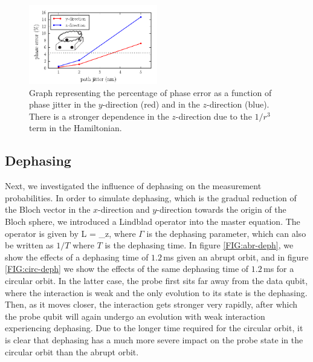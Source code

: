 \begin{figure}[h]
  \centering
    \includegraphics[width=0.5\textwidth]{../Figures/path_jit.pdf}
      \caption{Graph representing the percentage of phase error as a function of phase jitter in the $y$-direction (red) and in the $z$-direction (blue). There is a stronger dependence in the $z$-direction due to the $1/r^3$ term in the Hamiltonian.}
      \label{fig:pathjitter}
\end{figure}







\subsection{Dephasing}
Next, we investigated the influence of dephasing on the measurement probabilities. In order to simulate dephasing, which is the gradual reduction of the Bloch vector in the $x$-direction and $y$-direction towards the origin of the Bloch sphere, we introduced a Lindblad operator into the master equation. The operator is given by 
\beq
L  = \sqrt{\Gamma} \sigma_z,
\eeq
where $\Gamma$ is the dephasing parameter, which can also be written as $1/T$ where $T$ is the dephasing time. In figure \ref{FIG:abr-deph}, we show the effects of a dephasing time of $1.2\, $ms given an abrupt orbit, and in figure \ref{FIG:circ-deph} we show the effects of the same dephasing time of $1.2\, $ms for a circular orbit. In the latter case, the probe first sits far away from the data qubit, where the interaction is weak and the only evolution to its state is the dephasing. Then, as it moves closer, the interaction gets stronger very rapidly, after which the probe qubit will again undergo an evolution with weak interaction experiencing dephasing. Due to the longer time required for the circular orbit, it is clear that dephasing has a much more severe impact on the probe state in the circular orbit than the abrupt orbit. 

